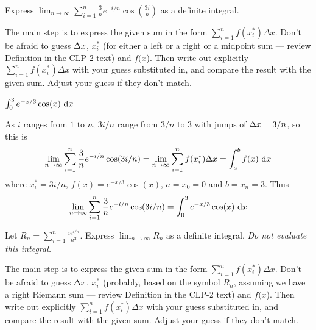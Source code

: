 \begin{question}[2016Q1]
Express $\displaystyle\lim_{n\to\infty}\displaystyle\sum_{i=1}^{n}
                       \frac{3}{n} e^{-i/n} \cos\left(\frac{3i}{n}\right)$
as a definite integral.
\end{question}

\begin{hint}
The main step is to express the given sum in the form $ \sum_{i=1}^{n} f(x_i^*)\Delta  x$.
Don't be afraid to guess $\Delta x$, $x_i^*$ (for either a left or a right or a  midpoint sum ---
review Definition   in the
CLP-2 text)
and $f(x$). Then write out explicitly $ \sum_{i=1}^{n} f(x_i^*)\Delta  x$ with your guess
substituted in, and compare the result with the given sum.  Adjust your guess if they don't match.
\end{hint}

\begin{answer}
$\int_0^3 e^{-x/3}\cos(x)\,\,\mathrm{d}x$
\end{answer}

\begin{solution}
As $i$ ranges from $1$ to $n$, $3i/n$ range from $3/n$ to $3$ with jumps of
$\Delta x=3/n$, so this is
\begin{align*}
\lim_{n\to\infty}\displaystyle\sum_{i=1}^{n}
                       \frac{3}{n} e^{-i/n} \cos(3i/n)
=\lim_{n\to\infty} \sum_{i=1}^{n} f(x_i^*)\Delta  x
=\int_a^b f(x)\,\,\mathrm{d}x
\end{align*}
where $x_i^* = 3i/n$, $f(x) = e^{-x/3}\cos(x)$, $a=x_0=0$ and $b=x_n=3$. Thus
\begin{align*}
\lim_{n\to\infty}\displaystyle\sum_{i=1}^{n}
                       \frac{3}{n} e^{-i/n} \cos(3i/n)
=\int_0^3 e^{-x/3}\cos(x)\,\,\mathrm{d}x
\end{align*}

\end{solution}

\begin{question}[2012A, 2014D]
Let $\displaystyle R_n= \sum_{i=1}^{n}
                       \frac{i e^{i/n}}{n^2}$.
Express $\displaystyle\lim_{n\to\infty}R_n$
as a definite integral. \emph{Do not evaluate this integral.}
\end{question}

\begin{hint}
The main step is to express the given sum in the form
$\sum\limits_{i=1}^{n} f(x_i^*)\Delta  x$.
Don't be afraid to guess $\Delta x$, $x_i^*$ (probably, based on the symbol $R_n$,
assuming we have a right Riemann sum ---
review Definition   in the CLP-2 text)
and $f(x$). Then write out explicitly $ \sum\limits_{i=1}^{n} f(x_i^*)\Delta  x$ with
your guess substituted in, and compare the result with the given sum.
Adjust your guess if they don't match.
\end{hint}

